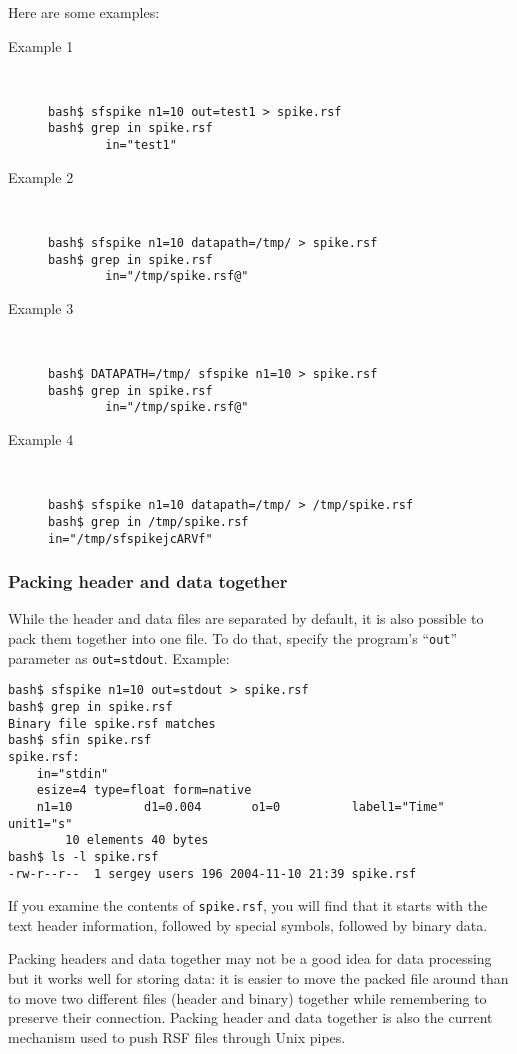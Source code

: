 Here are some examples:
\begin{description}
\item[Example 1] \ \\
\begin{verbatim}
bash$ sfspike n1=10 out=test1 > spike.rsf
bash$ grep in spike.rsf
        in="test1"
\end{verbatim}
\item[Example 2] \ \\
\begin{verbatim}
bash$ sfspike n1=10 datapath=/tmp/ > spike.rsf
bash$ grep in spike.rsf
        in="/tmp/spike.rsf@"
\end{verbatim}
\item[Example 3] \ \\
\begin{verbatim}
bash$ DATAPATH=/tmp/ sfspike n1=10 > spike.rsf
bash$ grep in spike.rsf
        in="/tmp/spike.rsf@"
\end{verbatim}
\item[Example 4] \ \\
\begin{verbatim}
bash$ sfspike n1=10 datapath=/tmp/ > /tmp/spike.rsf
bash$ grep in /tmp/spike.rsf
in="/tmp/sfspikejcARVf"
\end{verbatim}
\end{description}

\subsubsection{Packing header and data together}

While the header and data files are separated by default, it is also possible
to pack them together into one file. To do that, specify the program's
``\texttt{out}'' parameter as \texttt{out=stdout}. Example:
\begin{verbatim}
bash$ sfspike n1=10 out=stdout > spike.rsf
bash$ grep in spike.rsf
Binary file spike.rsf matches
bash$ sfin spike.rsf
spike.rsf:
    in="stdin"
    esize=4 type=float form=native
    n1=10          d1=0.004       o1=0          label1="Time" unit1="s"
        10 elements 40 bytes
bash$ ls -l spike.rsf
-rw-r--r--  1 sergey users 196 2004-11-10 21:39 spike.rsf
\end{verbatim}
If you examine the contents of \texttt{spike.rsf}, you will find that it
starts with the text header information, followed by special
symbols, followed by binary data. 

Packing headers and data together may not be a good idea for data processing
but it works well for storing data: it is easier to move the packed file
around than to move two different files (header and binary) together while
remembering to preserve their connection. Packing header and data together is
also the current mechanism used to push RSF files through Unix pipes.


